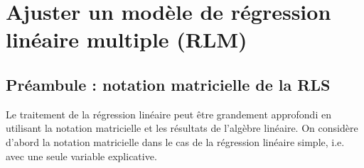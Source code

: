 \chapter{Ajuster un modèle de régression linéaire multiple (RLM)}
\label{sec:AjusterRLM}

\vspace{-0.1in}
\section{Préambule : notation matricielle de la RLS}

Le traitement de la régression linéaire peut être grandement approfondi
en utilisant la notation matricielle et les résultats de l'algèbre linéaire. On considère d'abord la notation matricielle dans le cas de la régression linéaire simple, i.e. avec une seule variable explicative.

